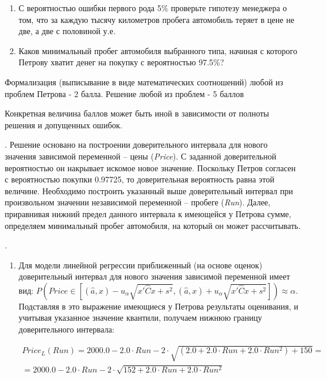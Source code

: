 \documentclass[pdftex,12pt,a4paper]{article}
\begin{document}
\begin{enumerate}
\begin{enumerate}
\item С вероятностью ошибки первого рода 5\% проверьте гипотезу менеджера о том, что за каждую тысячу километров пробега автомобиль теряет в цене не две, а две с половиной у.е. 
\item Каков минимальный пробег автомобиля выбранного типа, начиная с которого Петрову хватит денег на покупку с вероятностью  97.5\%?
\end{enumerate}


\solution

Формализация (выписывание в виде математических соотношений) любой из проблем Петрова - 2 балла. Решение любой из проблем - 5 баллов

Конкретная величина баллов может быть иной в зависимости от полноты решения и допущенных ошибок.


. Решение основано на построении доверительного интервала для нового значения зависимой переменной -- цены (\textit{Price}). С заданной доверительной вероятностью он накрывает искомое новое значение. Поскольку Петров согласен с вероятностью покупки 0.97725, то доверительная вероятность равна этой величине. Необходимо построить указанный выше доверительный интервал при произвольном значении независимой переменной -- пробеге (\textit{Run}). Далее, приравнивая нижний предел данного интервала к имеющейся у Петрова сумме, определяем минимальный пробег автомобиля, на который он может рассчитывать.  

. 

\begin{enumerate}
\item  Для модели линейной регрессии приближенный (на основе оценок) доверительный интервал для нового значения зависимой переменной имеет вид: $P\left(Price\in \left[\left(\hat{a},x\right)-u_{\alpha } \sqrt{x'\hat{C}x+s^{2} } ,\left(\hat{a},x\right)+u_{\alpha } \sqrt{x'\hat{C}x+s^{2} } \right]\right)\approx \alpha $. Подставляя в это выражение имеющиеся у Петрова результаты оценивания, и учитывая указанное значение квантили, получаем нижнюю границу доверительного интервала:

\[\begin{array}{l} {Price_{L} \left(Run\right)=2000.0-2.0\cdot Run-2\cdot \sqrt{\left(2.0+2.0\cdot Run+2.0\cdot Run^{2} \right)+150} =} \\ {=2000.0-2.0\cdot Run-2\cdot \sqrt{152+2.0\cdot Run+2.0\cdot Run^{2} } } \end{array}\] 


\end{enumerate}
\end{enumerate}
\end{document}
